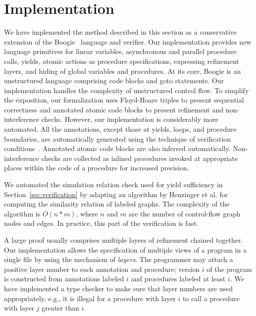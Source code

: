 \section{Implementation}
\label{sec:implementation}

We have implemented the method described in this section as a conservative extension 
of the Boogie~\cite{BarnettCDJL05} language and verifier.
Our implementation provides new language primitives for linear variables, asynchronous and parallel procedure calls, 
yields, atomic actions as procedure specifications, expressing refinement layers, and hiding of global variables and procedures.
At its core, Boogie is an unstructured language comprising code blocks and goto statements.
Our implementation handles the complexity of unstructured control flow.
To simplify the exposition, our formalization uses Floyd-Hoare triples to present sequential correctness and 
annotated atomic code blocks to present refinement and non-interference checks.
However, our implementation is considerably more automated.  
All the annotations, except those at yields, loops, and procedure boundaries, are automatically generated 
using the technique of verification conditions~\cite{BL05}.
Annotated atomic code blocks are also inferred automatically.
Non-interference checks are collected as inlined procedures
invoked at appropriate places within the code of a procedure for increased precision.

We automated the simulation relation check used for yield sufficiency in Section~\ref{sec:verification} 
by adapting an algorithm by Henzinger et al.\cite{HenzingerHK95} for computing the similarity relation of 
labeled graphs.
The complexity of the algorithm is $O(n*m)$, where $n$ and $m$ are the number of control-flow graph nodes and edges.
In practice, this part of the verification is fast.

A large proof usually comprises multiple layers of refinement chained together.
Our implementation allows the specification of multiple views of a program in a single file by using the mechanism of {\em layers}.
The programmer may attach a positive layer number to each annotation and procedure; 
version $i$ of the program is constructed from annotations labeled $i$ and procedures labeled at least $i$.
We have implemented a type checker to make sure that layer numbers are used appropriately, e.g., 
it is illegal for a procedure with layer $i$ to call a procedure with layer $j$ greater than $i$.

